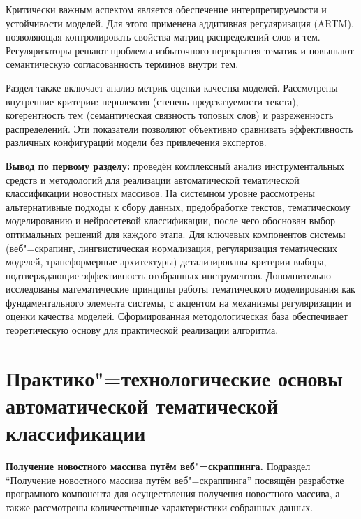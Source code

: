 \documentclass[autoref]{SCWorks}
\begin{document}
Критически важным аспектом является обеспечение интерпретируемости и
устойчивости моделей. Для этого применена аддитивная регуляризация (ARTM),
позволяющая контролировать свойства матриц распределений слов и тем.
Регуляризаторы решают проблемы избыточного перекрытия тематик и повышают
семантическую согласованность терминов внутри тем.

Раздел также включает анализ метрик оценки качества моделей. Рассмотрены
внутренние критерии: перплексия (степень предсказуемости текста), когерентность
тем (семантическая связность топовых слов) и разреженность распределений. Эти
показатели позволяют объективно сравнивать эффективность различных конфигураций
модели без привлечения экспертов.

\textbf{Вывод по первому разделу:} проведён комплексный анализ инструментальных
средств и методологий для реализации автоматической тематической классификации
новостных массивов. На системном уровне рассмотрены альтернативные подходы к
сбору данных, предобработке текстов, тематическому моделированию и нейросетевой
классификации, после чего обоснован выбор оптимальных решений для каждого этапа.
Для ключевых компонентов системы (веб"=скрапинг, лингвистическая нормализация,
регуляризация тематических моделей, трансформерные архитектуры) детализированы
критерии выбора, подтверждающие эффективность отобранных инструментов.
Дополнительно исследованы математические принципы работы тематического
моделирования как фундаментального элемента системы, с акцентом на механизмы
регуляризации и оценки качества моделей. Сформированная методологическая база
обеспечивает теоретическую основу для практической реализации алгоритма.

\section{Практико"=технологические основы автоматической тематической
классификации}

\textbf{Получение новостного массива путём веб"=скраппинга.}
Подраздел \enquote{Получение новостного массива путём веб"=скраппинга} посвящён
разработке програмного компонента для осуществления получения новостного
массива, а также рассмотрены количественные характеристики собранных данных.
\end{document}
